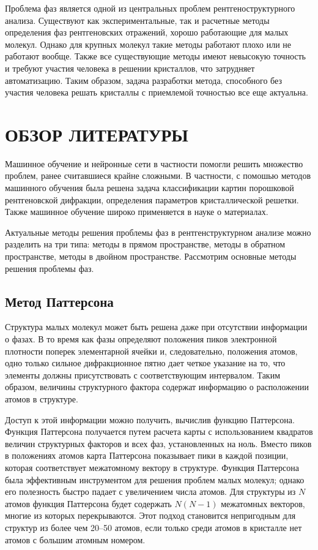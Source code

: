 \documentclass{article}
\begin{document}
Проблема фаз является одной из центральных проблем рентгеноструктурного анализа. Существуют как экспериментальные, так и расчетные методы определения фаз рентгеновских отражений, хорошо работающие для малых молекул. Однако для крупных молекул такие методы работают плохо или не работают вообще\cite{PhaseProblem}. Также все существующие методы имеют невысокую точность и требуют участия человека в решении кристаллов, что затрудняет автоматизацию. Таким образом, задача разработки метода, способного без участия человека решать кристаллы с приемлемой точностью все еще актуальна.

\section{ОБЗОР ЛИТЕРАТУРЫ}

Машинное обучение и нейронные сети в частности помогли решить множество проблем, ранее считавшиеся крайне сложными. В частности, с помошью методов машинного обучения была решена \cite{XRD-NN} задача классификации картин порошковой рентгеновской дифракции, определения параметров кристаллической решетки\cite{MCMC}. Также машинное обучение широко применяется в науке о материалах\cite{ML-mat}.

Актуальные методы решения проблемы фаз в рентгенструктурном анализе можно разделить на три типа: методы в прямом пространстве, методы в обратном пространстве, методы в двойном пространстве\cite{XR-ED}. Рассмотрим основные методы решения проблемы фаз.

\subsection{Метод Паттерсона}

Структура малых молекул может быть решена даже при отсутствии информации о фазах. В то время как фазы определяют положения пиков электронной плотности поперек элементарной ячейки и, следовательно, положения атомов, одно только сильное дифракционное пятно дает четкое указание на то, что элементы должны присутствовать с соответствующим интервалом. Таким образом, величины структурного фактора содержат информацию о расположении атомов в структуре.

Доступ к этой информации можно получить, вычислив функцию Паттерсона\cite{PattersonMethod}. Функция Паттерсона получается путем расчета карты с использованием квадратов величин структурных факторов и всех фаз, установленных на ноль. Вместо пиков в положениях атомов карта Паттерсона показывает пики в каждой позиции, которая соответствует межатомному вектору в структуре. Функция Паттерсона была эффективным инструментом для решения проблем малых молекул; однако его полезность быстро падает с увеличением числа атомов. Для структуры из $N$ атомов функция Паттерсона будет содержать $N (N - 1)$ межатомных векторов, многие из которых перекрываются. Этот подход становится непригодным для структур из более чем 20–50 атомов, если только среди атомов в кристалле нет атомов с большим атомным номером.
\end{document}
